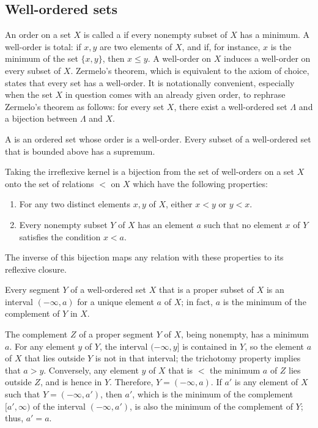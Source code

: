 \documentclass{article}
\begin{document}
\subsection{Well-ordered sets}
\label{sec:62tryw49}

An order on a set \(X\) is called a  if every
nonempty subset of \(X\) has a minimum.  A well-order is total: if
\(x,y\) are two elements of \(X\), and if, for instance, \(x\) is the
minimum of the set \(\{ x, y \}\), then \(x \leq y\).  A well-order on
\(X\) induces a well-order on every subset of \(X\).  Zermelo's
theorem, which is equivalent to the axiom of choice, states that every
set has a well-order.  It is notationally convenient, especially when
the set \(X\) in question comes with an already given order, to
rephrase Zermelo's theorem as follows: for every set \(X\), there
exist a well-ordered set \(\Lambda\) and a bijection between
\(\Lambda\) and \(X\).

A  is an ordered set whose order is a
well-order.  Every subset of a well-ordered set that is bounded above
has a supremum.

Taking the irreflexive kernel is a bijection from the set of
well-orders on a set \(X\) onto the set of relations \(<\) on \(X\)
which have the following properties:
\begin{enumerate}
\item For any two distinct elements \(x, y\) of \(X\), either
  \(x < y\) or \(y < x\).
\item Every nonempty subset \(Y\) of \(X\) has an element \(a\) such
  that no element \(x\) of \(Y\) satisfies the condition \(x < a\).
\end{enumerate}
The inverse of this bijection maps any relation with these properties
to its reflexive closure.

\begin{theorem}
  \label{thm:htdzbbwv}
  Every segment \(Y\) of a well-ordered set \(X\) that is a proper
  subset of \(X\) is an interval \((-\infty, a)\) for a unique element
  \(a\) of \(X\); in fact, \(a\) is the minimum of the complement of
  \(Y\) in \(X\).
\end{theorem}

The complement \(Z\) of a proper segment \(Y\) of \(X\), being
nonempty, has a minimum \(a\).  For any element \(y\) of \(Y\), the
interval \((-\infty,y]\) is contained in \(Y\), so the element \(a\)
of \(X\) that lies outside \(Y\) is not in that interval; the
trichotomy property implies that \(a > y\).  Conversely, any element
\(y\) of \(X\) that is \(<\) the minimum \(a\) of \(Z\) lies outside
\(Z\), and is hence in \(Y\).  Therefore, \(Y = (-\infty,a)\).  If
\(a'\) is any element of \(X\) such that \(Y = (-\infty, a')\), then
\(a'\), which is the minimum of the complement \([a', \infty)\) of the
interval \((-\infty, a')\), is also the minimum of the complement of
\(Y\); thus, \(a' = a\).
\end{document}
